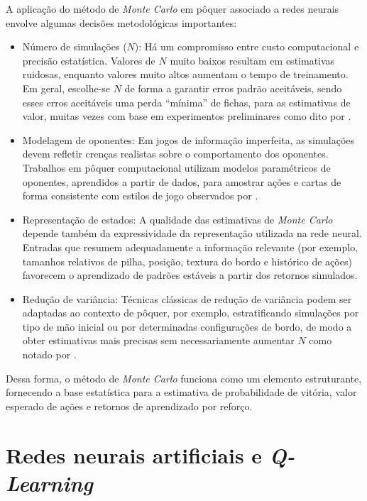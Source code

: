 A aplicação do método de \textit{Monte Carlo} em pôquer associado a redes neurais envolve algumas decisões metodológicas importantes:
\begin{itemize}
      \item Número de simulações (\(N\)): Há um compromisso entre custo computacional e precisão estatística. Valores de \(N\) muito baixos resultam em estimativas ruidosas, enquanto valores muito altos aumentam o tempo de treinamento. Em geral, escolhe-se \(N\) de forma a garantir erros padrão aceitáveis, sendo esses erros aceitáveis uma perda ``mínima'' de fichas, para as estimativas de valor, muitas vezes com base em experimentos preliminares como dito por .
      \item Modelagem de oponentes: Em jogos de informação imperfeita, as simulações devem refletir crenças realistas sobre o comportamento dos oponentes. Trabalhos em pôquer computacional utilizam modelos paramétricos de oponentes, aprendidos a partir de dados, para amostrar ações e cartas de forma consistente com estilos de jogo observados por .
      \item Representação de estados: A qualidade das estimativas de \textit{Monte Carlo} depende também da expressividade da representação utilizada na rede neural. Entradas que resumem adequadamente a informação relevante (por exemplo, tamanhos relativos de pilha, posição, textura do bordo e histórico de ações) favorecem o aprendizado de padrões estáveis a partir dos retornos simulados.
      \item Redução de variância: Técnicas clássicas de redução de variância podem ser adaptadas ao contexto de pôquer, por exemplo, estratificando simulações por tipo de mão inicial ou por determinadas configurações de bordo, de modo a obter estimativas mais precisas sem necessariamente aumentar \(N\) como notado por .
\end{itemize}

Dessa forma, o método de \textit{Monte Carlo} funciona como um elemento estruturante, fornecendo a base estatística para a estimativa de probabilidade de vitória, valor esperado de ações e retornos de aprendizado por reforço.

\section{Redes neurais artificiais e \textit{Q-Learning}}

